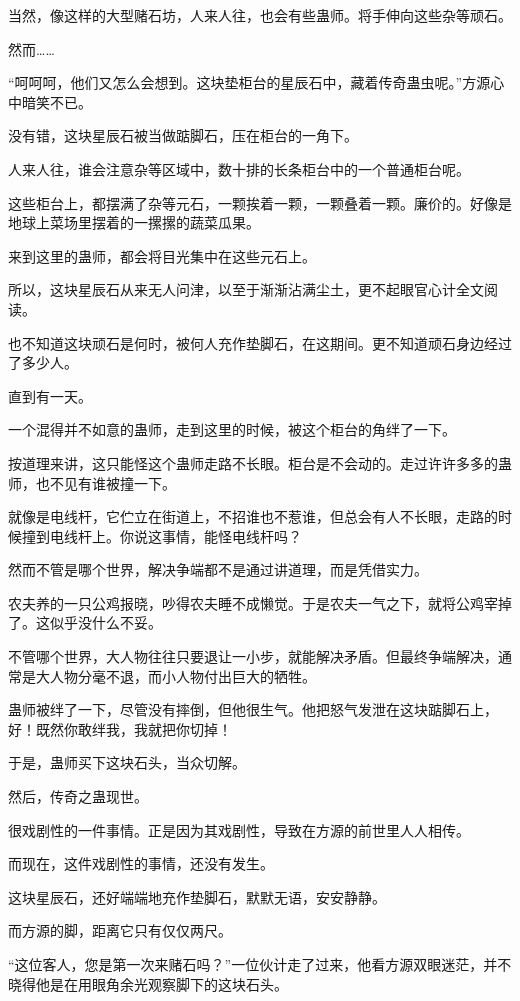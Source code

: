 \begin{this_body}
当然，像这样的大型赌石坊，人来人往，也会有些蛊师。将手伸向这些杂等顽石。

然而……

“呵呵呵，他们又怎么会想到。这块垫柜台的星辰石中，藏着传奇蛊虫呢。”方源心中暗笑不已。

没有错，这块星辰石被当做踮脚石，压在柜台的一角下。

人来人往，谁会注意杂等区域中，数十排的长条柜台中的一个普通柜台呢。

这些柜台上，都摆满了杂等元石，一颗挨着一颗，一颗叠着一颗。廉价的。好像是地球上菜场里摆着的一摞摞的蔬菜瓜果。

来到这里的蛊师，都会将目光集中在这些元石上。

所以，这块星辰石从来无人问津，以至于渐渐沾满尘土，更不起眼官心计全文阅读。

也不知道这块顽石是何时，被何人充作垫脚石，在这期间。更不知道顽石身边经过了多少人。

直到有一天。

一个混得并不如意的蛊师，走到这里的时候，被这个柜台的角绊了一下。

按道理来讲，这只能怪这个蛊师走路不长眼。柜台是不会动的。走过许许多多的蛊师，也不见有谁被撞一下。

就像是电线杆，它伫立在街道上，不招谁也不惹谁，但总会有人不长眼，走路的时候撞到电线杆上。你说这事情，能怪电线杆吗？

然而不管是哪个世界，解决争端都不是通过讲道理，而是凭借实力。

农夫养的一只公鸡报晓，吵得农夫睡不成懒觉。于是农夫一气之下，就将公鸡宰掉了。这似乎没什么不妥。

不管哪个世界，大人物往往只要退让一小步，就能解决矛盾。但最终争端解决，通常是大人物分毫不退，而小人物付出巨大的牺牲。

蛊师被绊了一下，尽管没有摔倒，但他很生气。他把怒气发泄在这块踮脚石上，好！既然你敢绊我，我就把你切掉！

于是，蛊师买下这块石头，当众切解。

然后，传奇之蛊现世。

很戏剧性的一件事情。正是因为其戏剧性，导致在方源的前世里人人相传。

而现在，这件戏剧性的事情，还没有发生。

这块星辰石，还好端端地充作垫脚石，默默无语，安安静静。

而方源的脚，距离它只有仅仅两尺。

“这位客人，您是第一次来赌石吗？”一位伙计走了过来，他看方源双眼迷茫，并不晓得他是在用眼角余光观察脚下的这块石头。


\end{this_body}
